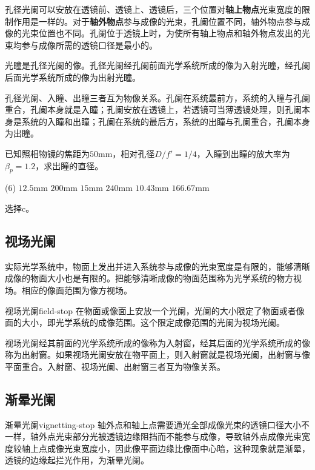 \documentclass[cn,10pt,chinesefont=founder,math=mtpro2,cite=super,toc=onecol,twoside,openany]{elegantbook}
\begin{document}
孔径光阑可以安放在透镜前、透镜上、透镜后，三个位置对\textbf{轴上物点}光束宽度的限制作用是一样的。对于\textbf{轴外物点}参与成像的光束，孔阑位置不同，轴外物点参与成像的光束位置也不同。孔阑位于透镜上时，为使所有轴上物点和轴外物点发出的光束均参与成像所需的透镜口径是最小的。

光瞳是孔径光阑的像。孔径光阑经孔阑前面光学系统所成的像为入射光瞳，经孔阑后面光学系统所成的像为出射光瞳。

孔径光阑、入瞳、出瞳三者互为物像关系。孔阑在系统最前方，系统的入瞳与孔阑重合，孔阑本身就是入瞳；孔阑安放在透镜上，若透镜可当薄透镜处理，则孔阑本身是系统的入瞳和出瞳；孔阑在系统的最后方，系统的出瞳与孔阑重合，孔阑本身为出瞳。

\begin{problem}
	已知照相物镜的焦距为$50\mathrm{mm}$，相对孔径$D/f'=1/4$，入瞳到出瞳的放大率为$\beta_p=1.2$，求出瞳的直径。 
	\begin{tasks}(6)
		\task $12.5\mathrm{mm}$
		\task $200\mathrm{mm}$
		\task $15\mathrm{mm}$
		\task $240\mathrm{mm}$
		\task $10.43\mathrm{mm}$
		\task $166.67\mathrm{mm}$
	\end{tasks}
\end{problem}
\begin{solution}
	选择c。
\end{solution}

\subsection{视场光阑}
\label{subsect:field-stop}
实际光学系统中，物面上发出并进入系统参与成像的光束宽度是有限的，能够清晰成像的物面大小也是有限的。把能够清晰成像的物面范围称为光学系统的物方视场。相应的像面范围为像方视场。

\begin{definition}{视场光阑}{field-stop}
	在物面或像面上安放一个光阑，光阑的大小限定了物面或者像面的大小，即光学系统的成像范围。这个限定成像范围的光阑为视场光阑。
\end{definition}

视场光阑经其前面的光学系统所成的像称为入射窗，经其后面的光学系统所成的像称为出射窗。如果视场光阑安放在物平面上，则入射窗就是视场光阑，出射窗与像平面重合。入射窗、视场光阑、出射窗三者互为物像关系。

\subsection{渐晕光阑}
\label{subsect:vignetting-stop}
\begin{definition}{渐晕光阑}{vignetting-stop}
轴外点和轴上点需要通光全部成像光束的透镜口径大小不一样，轴外点光束部分光被透镜边缘阻挡而不能参与成像，导致轴外点成像光束宽度较轴上点成像光束宽度小，因此像平面边缘比像面中心暗，这种现象就是渐晕，透镜的边缘起拦光作用，为渐晕光阑。
\end{definition}
\end{document}
